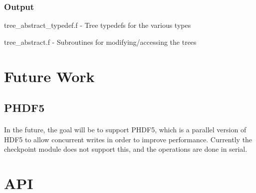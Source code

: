 \documentclass{article}
\begin{document}
\subsubsection{Output}
\begin{list}{}{}
\item tree\_abstract\_typedef.f - Tree typedefs for the various types
\item tree\_abstract.f - Subroutines for modifying/accessing the trees
\end{list}

\section{Future Work}
\subsection{PHDF5}
\paragraph{}
In the future, the goal will be to support PHDF5, which is a parallel version of HDF5 to allow concurrent writes in order to improve performance. Currently the checkpoint module does not support this, and the operations are done in serial.

\section{API}
\end{document}
